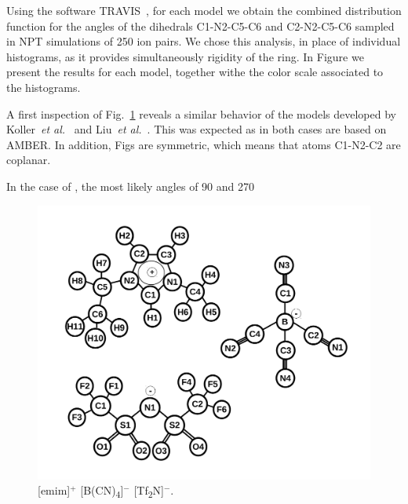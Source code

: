 \documentclass[3p,twocolumn]{elsarticle}
\begin{document}
Using the software TRAVIS~\cite{Brehm_2011}, for each model we obtain the combined distribution function for the angles of the dihedrals C1-N2-C5-C6 and C2-N2-C5-C6 sampled in NPT simulations of 250 ion pairs. We chose this analysis, in place of individual histograms, as it provides simultaneously rigidity of the ring. In Figure we present the results for each model, together withe the color scale associated to the histograms.

A first inspection of Fig.~\ref{fig:atoms_id} reveals a similar behavior of the models developed by Koller~\textit{et al.}~\cite{Koller_2012} and Liu~\textit{et al.}~\cite{Liu_2014}. This was expected as in both cases are based on AMBER. In addition, Figs are symmetric, which means that atoms C1-N2-C2 are coplanar.

In the case of , the most likely angles of 90 and 270 

\begin{figure}[H]
\centering
\includegraphics[width=\linewidth]{ions_paper.pdf}
\caption{[emim]$^{+}$ [B(CN)\textsubscript{4}]$^{-}$ [Tf\textsubscript{2}N]$^{-}$.}
\label{fig:atoms_id}
\end{figure}
\end{document}
